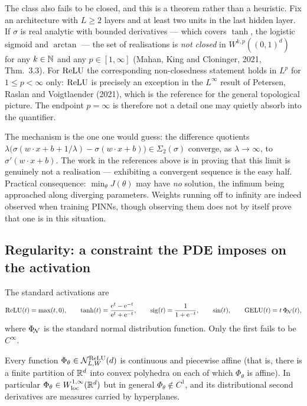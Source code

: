 \documentclass[11pt,a4paper]{article}
\begin{document}
\begin{remark}\label{rem:nonclosed}
The class also fails to be closed, and this is a theorem rather than a heuristic. Fix an
architecture with $L \ge 2$ layers and at least two units in the last hidden layer. If $\sigma$ is
real analytic with bounded derivatives --- which covers $\tanh$, the logistic sigmoid and
$\arctan$ --- the set of realisations is \emph{not closed} in $W^{k,p}((0,1)^d)$ for any $k \in \mathbb{N}$
and any $p \in [1,\infty]$ (Mahan, King and Cloninger, 2021, Thm.\ 3.3). For $\operatorname{ReLU}$ the
corresponding non-closedness statement holds in $L^p$ for $1 \le p < \infty$ only: $\operatorname{ReLU}$ is
precisely an exception in the $L^\infty$ result of Petersen, Raslan and Voigtlaender (2021), which
is the reference for the general topological picture. The endpoint $p = \infty$ is therefore not a
detail one may quietly absorb into the quantifier.

The mechanism is the one one would guess: the difference quotients
$\lambda\big(\sigma(w\cdot x + b + 1/\lambda) - \sigma(w \cdot x + b)\big) \in \Sigma_2(\sigma)$
converge, as $\lambda \to \infty$, to $\sigma'(w\cdot x + b)$. The work in the references above is
in proving that this limit is genuinely not a realisation --- exhibiting a convergent sequence is
the easy half. Practical consequence: $\min_{\theta} J(\theta)$ may have \emph{no} solution, the
infimum being approached along diverging parameters. Weights running off to infinity are indeed
observed when training PINNs, though observing them does not by itself prove that one is in this
situation.
\end{remark}

\subsection{Regularity: a constraint the PDE imposes on the activation}

The standard activations are
\[
\operatorname{ReLU}(t) = \max(t,0), \qquad
\tanh(t) = \frac{\mathrm{e}^t - \mathrm{e}^{-t}}{\mathrm{e}^t+\mathrm{e}^{-t}}, \qquad
\mathrm{sig}(t) = \frac{1}{1+\mathrm{e}^{-t}}, \qquad
\sin(t), \qquad
\mathrm{GELU}(t) = t\,\Phi_{\!\mathcal{N}}(t),
\]
where $\Phi_{\!\mathcal{N}}$ is the standard normal distribution function. Only the first fails to be
$C^\infty$.

\begin{proposition}\label{prop:relu}
Every function $\Phi_\theta \in \mathcal{N}^{\operatorname{ReLU}}_{L,W}(d)$ is continuous and piecewise affine (that is,
there is a finite partition of $\mathbb{R}^d$ into convex polyhedra on each of which $\Phi_\theta$ is
affine). In particular $\Phi_\theta \in W^{1,\infty}_{\mathrm{loc}}(\mathbb{R}^d)$ but in general
$\Phi_\theta \notin C^1$, and its distributional second derivatives are measures carried by
hyperplanes.
\end{proposition}
\end{document}
